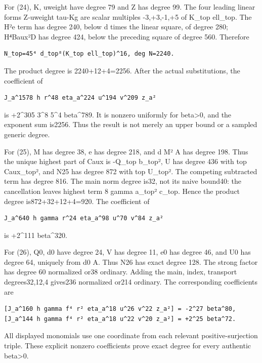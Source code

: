 \documentclass[
  10pt,
]{article}
\begin{document}
For (24), K, uweight have degree 79 and Z has degree 99. The four leading
linear forms Z-uweight tau-Kg are scalar multiples -3,+3,-1,+5 of K\_top
ell\_top. The H²e term has degree 240, below d times the linear square,
of degree 280; H⁴Baux²D has degree 424, below the preceding square of
degree 560. Therefore

\begin{verbatim}
N_top=45⁴ d_top⁸(K_top ell_top)^16, deg N=2240.
\end{verbatim}

The product degree is 2240+12+4=2256. After the actual substitutions,
the coefficient of

\begin{verbatim}
J_a^1578 h r^48 eta_a^224 u^194 v^209 z_a²
\end{verbatim}

is +2\^{}305 3\^{}8 5\^{}4 beta\^{}789. It is nonzero uniformly for
beta\textgreater0, and the exponent sum is2256. Thus the result is not
merely an upper bound or a sampled generic degree.

For (25), M has degree 38, e has degree 218, and d M² A has degree 198.
Thus the unique highest part of Caux is -Q\_top b\_top², U has degree
436 with top Caux\_top², and N25 has degree 872 with top U\_top². The
competing subtracted term has degree 816. The main norm degree is32, not
its naive bound40: the cancellation leaves highest term 8 gamma a\_top²
c\_top. Hence the product degree is872+32+12+4=920. The coefficient of

\begin{verbatim}
J_a^640 h gamma r^24 eta_a^98 u^70 v^84 z_a²
\end{verbatim}

is +2\^{}111 beta\^{}320.

For (26), Q0, d0 have degree 24, V has degree 11, e0 has degree 46, and
U0 has degree 64, uniquely from d0 A. Thus N26 has exact degree 128. The
strong factor has degree 60 normalized or38 ordinary. Adding the
main, index, transport degrees32,12,4 gives236 normalized or214 ordinary.
The corresponding coefficients are

\begin{verbatim}
[J_a^160 h gamma f⁴ r² eta_a^18 u^26 v^22 z_a²] = -2^27 beta^80,
[J_a^144 h gamma f⁴ r² eta_a^18 u^22 v^20 z_a²] = +2^25 beta^72.
\end{verbatim}

All displayed monomials use one coordinate from each relevant
positive-surjection triple. These explicit nonzero coefficients prove
exact degree for every authentic beta\textgreater0.
\end{document}
